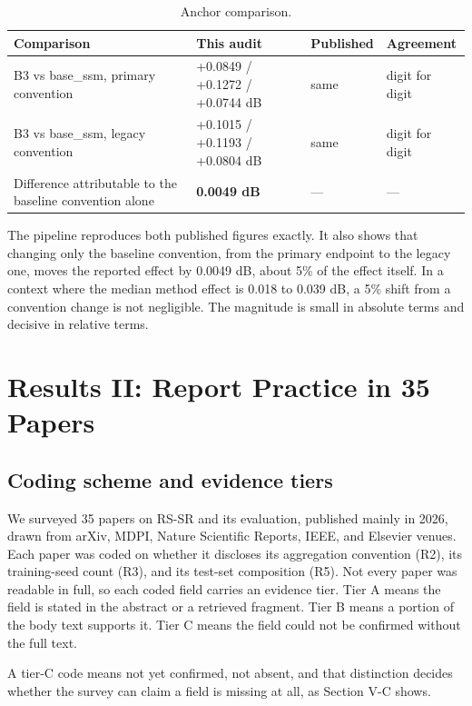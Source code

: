 \documentclass[journal,twoside,10pt]{IEEEtran}
\newlength{\tblavail}
\begin{document}
\begin{table}[!t]
\caption{Anchor comparison.}
\label{tab:VI}
\centering
\small
\setlength{\tabcolsep}{3pt}
\setlength{\tblavail}{\dimexpr\columnwidth-8\tabcolsep\relax}
\begin{tabular}{p{0.388\tblavail}p{0.208\tblavail}p{0.187\tblavail}p{0.187\tblavail}}
\hline
Comparison & This audit & Published & Agreement \\
\hline
B3 vs base\_ssm, primary convention & +0.0849 / +0.1272 / +0.0744 dB & same & digit for digit \\
B3 vs base\_ssm, legacy convention & +0.1015 / +0.1193 / +0.0804 dB & same & digit for digit \\
Difference attributable to the baseline convention alone & \textbf{0.0049 dB} & --- & --- \\
\hline
\end{tabular}
\end{table}

The pipeline reproduces both published figures exactly. It also shows that changing only the baseline convention, from the primary endpoint to the legacy one, moves the reported effect by 0.0049 dB, about 5\% of the effect itself. In a context where the median method effect is 0.018 to 0.039 dB, a 5\% shift from a convention change is not negligible. The magnitude is small in absolute terms and decisive in relative terms.

\section{Results II: Report Practice in 35 Papers}


\subsection{Coding scheme and evidence tiers}


We surveyed 35 papers on RS-SR and its evaluation, published mainly in 2026, drawn from arXiv, MDPI, Nature Scientific Reports, IEEE, and Elsevier venues. Each paper was coded on whether it discloses its aggregation convention (R2), its training-seed count (R3), and its test-set composition (R5). Not every paper was readable in full, so each coded field carries an evidence tier. Tier A means the field is stated in the abstract or a retrieved fragment. Tier B means a portion of the body text supports it. Tier C means the field could not be confirmed without the full text.

A tier-C code means not yet confirmed, not absent, and that distinction decides whether the survey can claim a field is missing at all, as Section V-C shows.
\end{document}
